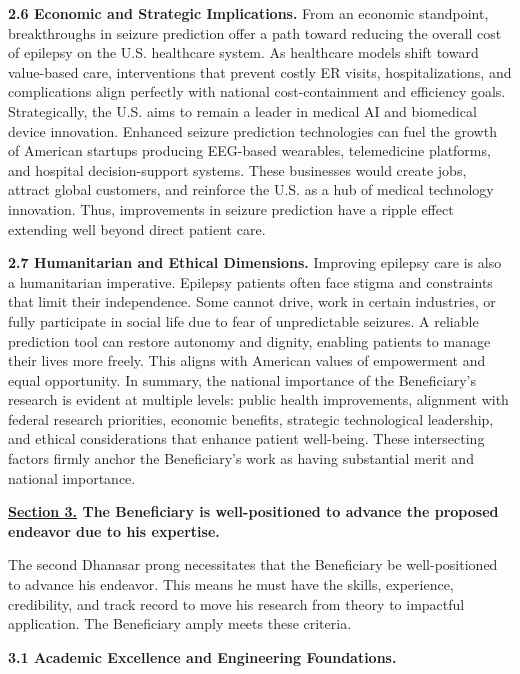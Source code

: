 \documentclass{article}
\begin{document}
{\bf 2.6 Economic and Strategic Implications. }
From an economic standpoint, breakthroughs in seizure prediction offer a path toward reducing the overall cost of epilepsy on the U.S. healthcare system. As healthcare models shift toward value-based care, interventions that prevent costly ER visits, hospitalizations, and complications align perfectly with national cost-containment and efficiency goals.
Strategically, the U.S. aims to remain a leader in medical AI and biomedical device innovation. Enhanced seizure prediction technologies can fuel the growth of American startups producing EEG-based wearables, telemedicine platforms, and hospital decision-support systems. These businesses would create jobs, attract global customers, and reinforce the U.S. as a hub of medical technology innovation. Thus, improvements in seizure prediction have a ripple effect extending well beyond direct patient care.

{\bf 2.7 Humanitarian and Ethical Dimensions. }
Improving epilepsy care is also a humanitarian imperative. Epilepsy patients often face stigma and constraints that limit their independence. Some cannot drive, work in certain industries, or fully participate in social life due to fear of unpredictable seizures. A reliable prediction tool can restore autonomy and dignity, enabling patients to manage their lives more freely. This aligns with American values of empowerment and equal opportunity.
In summary, the national importance of the Beneficiary’s research is evident at multiple levels: public health improvements, alignment with federal research priorities, economic benefits, strategic technological leadership, and ethical considerations that enhance patient well-being. These intersecting factors firmly anchor the Beneficiary’s work as having substantial merit and national importance.


\clearpage

{\bf \underline{Section 3.} The Beneficiary is well-positioned to advance the proposed endeavor due to his expertise. }

The second Dhanasar prong necessitates that the Beneficiary be well-positioned to advance his endeavor. This means he must have the skills, experience, credibility, and track record to move his research from theory to impactful application. The Beneficiary amply meets these criteria.


{\bf 3.1 Academic Excellence and Engineering Foundations.}
\end{document}
